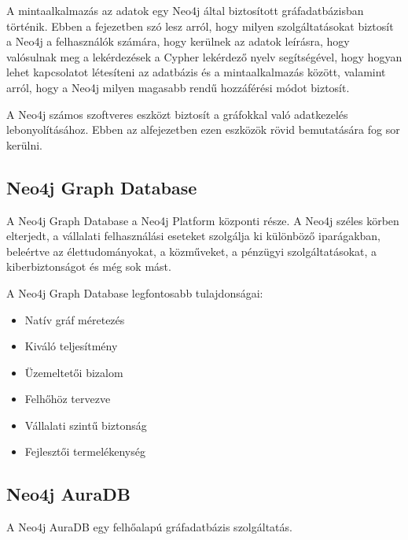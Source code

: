 
A mintaalkalmazás az adatok egy Neo4j által biztosított gráfadatbázisban történik. Ebben a fejezetben szó lesz arról, hogy milyen szolgáltatásokat biztosít a Neo4j a felhasználók számára, hogy kerülnek az adatok leírásra, hogy valósulnak meg a lekérdezések a Cypher lekérdező nyelv segítségével, hogy hogyan lehet kapcsolatot létesíteni az adatbázis és a mintaalkalmazás között, valamint arról, hogy a Neo4j milyen magasabb rendű hozzáférési módot biztosít.



A Neo4j számos szoftveres eszközt biztosít a gráfokkal való adatkezelés lebonyolításához. Ebben az alfejezetben ezen eszközök rövid bemutatására fog sor kerülni.

\subsection{Neo4j Graph Database}

A Neo4j Graph Database a Neo4j Platform központi része. A Neo4j széles körben elterjedt, a vállalati felhasználási eseteket szolgálja ki különböző iparágakban, beleértve az élettudományokat, a közműveket, a pénzügyi szolgáltatásokat, a kiberbiztonságot és még sok mást. \cite{neo4j-graph-database}

\bigskip

\noindent A Neo4j Graph Database legfontosabb tulajdonságai:
\begin{itemize}
      \item Natív gráf méretezés
      \item Kiváló teljesítmény
      \item Üzemeltetői bizalom
      \item Felhőhöz tervezve
      \item Vállalati szintű biztonság
      \item Fejlesztői termelékenység
\end {itemize}

\subsection{Neo4j AuraDB}
A Neo4j AuraDB egy felhőalapú gráfadatbázis szolgáltatás. 

